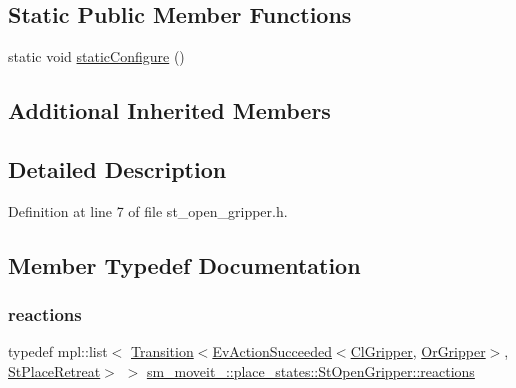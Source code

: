 \subsection*{Static Public Member Functions}
\begin{DoxyCompactItemize}
\item 
static void \hyperlink{structsm__moveit__4_1_1place__states_1_1StOpenGripper_a83a52c51baf50a5519763fcf7a5f5a22}{static\+Configure} ()
\end{DoxyCompactItemize}
\subsection*{Additional Inherited Members}


\subsection{Detailed Description}


Definition at line 7 of file st\+\_\+open\+\_\+gripper.\+h.



\subsection{Member Typedef Documentation}
\mbox{\label{structsm__moveit__4_1_1place__states_1_1StOpenGripper_a66d2d0a95ac3b2d672ac8d3735fd2a3c}} 
\subsubsection{\texorpdfstring{reactions}{reactions}}
{\footnotesize\ttfamily typedef mpl\+::list$<$ \hyperlink{classsmacc_1_1Transition}{Transition}$<$\hyperlink{structsmacc_1_1default__events_1_1EvActionSucceeded}{Ev\+Action\+Succeeded}$<$\hyperlink{classsm__moveit__4_1_1cl__gripper_1_1ClGripper}{Cl\+Gripper}, \hyperlink{classsm__moveit__4_1_1OrGripper}{Or\+Gripper}$>$, \hyperlink{structsm__moveit__4_1_1place__states_1_1StPlaceRetreat}{St\+Place\+Retreat}$>$ $>$ \hyperlink{structsm__moveit__4_1_1place__states_1_1StOpenGripper_a66d2d0a95ac3b2d672ac8d3735fd2a3c}{sm\+\_\+moveit\+\_\+::place\+\_\+states\+::\+St\+Open\+Gripper\+::reactions}}



